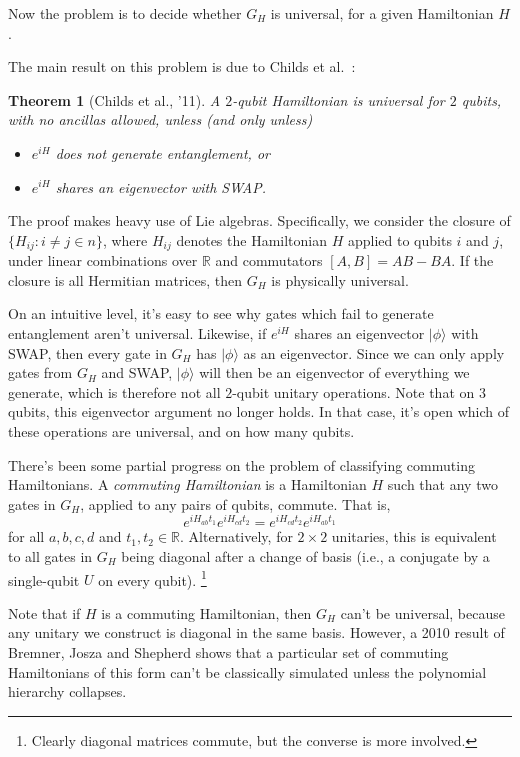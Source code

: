 \documentclass[11pt]{report}
\theoremstyle{plain}
\newtheorem{theorem}{Theorem}[section]
\theoremstyle{definition}
\newcommand{\R}{{\mathbb R}}
\renewcommand{\ket}[1]{|#1\rangle}
\begin{document}
Now the problem is to decide whether $G_H$ is universal, for a given Hamiltonian $H$.

The main result on this problem is due to Childs et al.\ \cite{childs}:

\begin{theorem}[Childs et al., '11]
A $2$-qubit Hamiltonian is universal for $2$ qubits, with no ancillas allowed, unless (and only unless)
\begin{itemize}
\item $e^{iH}$ does not generate entanglement, or
\item $e^{iH}$ shares an eigenvector with SWAP.
\end{itemize}
\end{theorem}

The proof makes heavy use of Lie algebras. Specifically, we consider the closure of $\{ H_{ij} : i \neq j \in n \}$, where $H_{ij}$ denotes the Hamiltonian $H$ applied to qubits $i$ and $j$, under linear combinations over $\R$ and commutators $[A,B] = AB - BA$. If the closure is all Hermitian matrices, then $G_H$ is physically universal.

On an intuitive level, it's easy to see why gates which fail to generate entanglement aren't universal. Likewise, if $e^{iH}$ shares an eigenvector $\ket{\phi}$ with SWAP, then every gate in $G_H$ has $\ket{\phi}$ as an eigenvector. Since we can only apply gates from $G_H$ and SWAP, $\ket{\phi}$ will then be an eigenvector of everything we generate, which is therefore not all $2$-qubit unitary operations. Note that on $3$ qubits, this eigenvector argument no longer holds. In that case, it's open which of these operations are universal, and on how many qubits.

There's been some partial progress on the problem of classifying commuting Hamiltonians. A \emph{commuting Hamiltonian} is a Hamiltonian $H$ such that any two gates in $G_H$, applied to any pairs of qubits, commute. That is,
$$
e^{i H_{ab} t_1} e^{i H_{cd} t_2} = e^{i H_{cd} t_2} e^{i H_{ab} t_1}
$$
for all $a,b,c,d$ and $t_1, t_2 \in \R$. Alternatively, for $2 \times 2$ unitaries, this is equivalent to all gates in $G_H$ being diagonal after a change of basis (i.e., a conjugate by a single-qubit $U$ on every qubit). \footnote{Clearly diagonal matrices commute, but the converse is more involved.}

Note that if $H$ is a commuting Hamiltonian, then $G_H$ can't be universal, because any unitary we construct is diagonal in the same basis. However, a 2010 result of Bremner, Josza and Shepherd \cite{bremner} shows that a particular set of commuting Hamiltonians of this form can't be classically simulated unless the polynomial hierarchy collapses.
\end{document}
